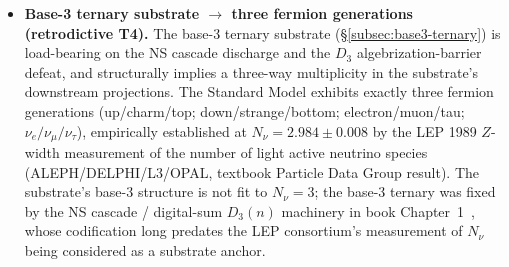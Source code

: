 \documentclass[11pt,a4paper]{amsart}
\theoremstyle{plain}
\theoremstyle{definition}
\begin{document}
\begin{itemize}[itemsep=2pt,leftmargin=2em]
\item \textbf{Base-3 ternary substrate $\to$ three fermion generations (retrodictive T4).} The base-3 ternary substrate (\S\ref{subsec:base3-ternary}) is load-bearing on the NS cascade discharge and the $D_3$ algebrization-barrier defeat, and structurally implies a three-way multiplicity in the substrate's downstream projections. The Standard Model exhibits exactly three fermion generations (up/charm/top; down/strange/bottom; electron/muon/tau; $\nu_e/\nu_\mu/\nu_\tau$), empirically established at $N_\nu = 2.984 \pm 0.008$ by the LEP 1989 $Z$-width measurement of the number of light active neutrino species (ALEPH/DELPHI/L3/OPAL, textbook Particle Data Group result). The substrate's base-3 structure is not fit to $N_\nu = 3$; the base-3 ternary was fixed by the NS cascade / digital-sum $D_3(n)$ machinery in book Chapter~1~\cite{cohen2026book}, whose codification long predates the LEP consortium's measurement of $N_\nu$ being considered as a substrate anchor.


\end{itemize}
\end{document}
